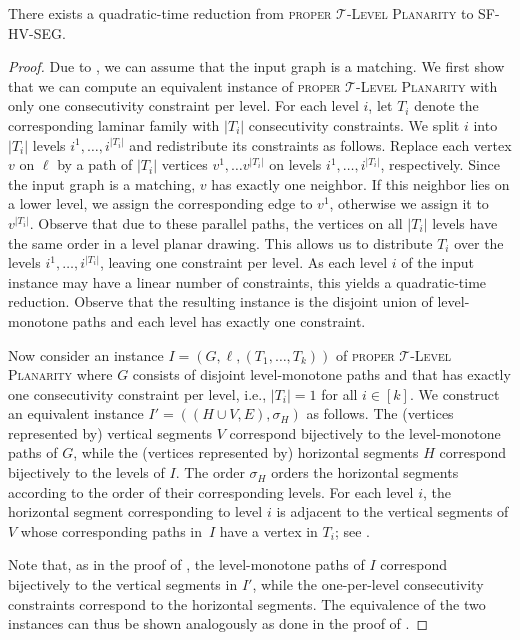 \documentclass[runningheads]{llncs}
\newcommand{\tlp}{\textsc{proper $\mathcal T$-Level Planarity}\xspace}
\newcommand{\hvp}{\textsc{SF-HV-SEG}\xspace}
\begin{document}
\begin{lemma}
  \label{lem:tlp-hv}
  There exists a quadratic-time reduction from \tlp to \hvp.
\end{lemma}
\begin{proof}
Due to , we can assume that the input graph is a matching.
  We first show that we can compute an equivalent instance of \tlp with only one consecutivity constraint per level.
  For each level $i$, let $T_i$ denote the corresponding laminar family with $|T_i|$ consecutivity constraints.
  We split $i$ into $|T_i|$ levels $i^1, \dots, i^{|T_i|}$ and redistribute its constraints as follows.
  Replace each vertex $v$ on $\ell$ by a path of $|T_i|$ vertices $v^1, \dots v^{|T_i|}$ on levels $i^1, \dots, i^{|T_i|}$, respectively.
  Since the input graph is a matching, $v$ has exactly one neighbor.
If this neighbor lies on a lower level, we assign the corresponding edge to $v^1$, otherwise we assign it to $v^{|T_i|}$.
  Observe that due to these parallel paths, the vertices on all $|T_i|$ levels have the same order in a level planar drawing.
  This allows us to distribute $T_i$ over the levels $i^1, \dots, i^{|T_i|}$, leaving one constraint per level.
  As each level $i$ of the input instance may have a linear number of constraints, this yields a quadratic-time reduction.
  Observe that the resulting instance is the disjoint union of level-monotone paths and each level has exactly one constraint.
  
  Now consider an instance $I = (G, \ell, (T_1, \dots, T_k))$ of \tlp where $G$ consists of disjoint level-monotone paths and that has exactly one consecutivity constraint per level, i.e., $|T_i| = 1$ for all $i\in[k]$.
  We construct an equivalent instance $I' = ((H \cup V, E), \sigma_H)$ as follows.
  The (vertices represented by) vertical segments $V$ correspond bijectively to the level-monotone paths of $G$, while the (vertices represented by) horizontal segments $H$ correspond bijectively to the levels of $I$.
  The order $\sigma_H$ orders the horizontal segments according to the order of their corresponding levels.
For each level $i$, the horizontal segment corresponding to level $i$ is adjacent to the vertical segments of $V$ whose corresponding paths in~$I$ have a vertex in $T_i$; see .
  
  Note that, as in the proof of , the level-monotone paths of $I$ correspond bijectively to the vertical segments in $I'$, while the one-per-level consecutivity constraints correspond to the horizontal segments.
  The equivalence of the two instances can thus be shown analogously as done in the proof of .
\end{proof}
\end{document}
